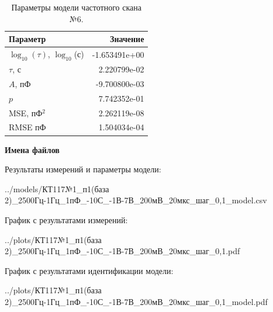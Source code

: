 \begin{table}[!ht]
    \centering
    \caption{Параметры модели частотного скана №6.}
    \begin{tabular}{|l|r|}
        \hline
        Параметр                                       & Значение                  \\ \hline
        $\log_{10}(\tau)$, $\log_{10}$(с)              & -1.653491e+00             \\ \hline
        $\tau$, с                                      & 2.220799e-02              \\ \hline
        $A$, пФ                                        & -9.700800e-03             \\ \hline
        $p$                                            & 7.742352e-01              \\ \hline
        MSE, пФ$^2$                                    & 2.262119e-08              \\ \hline
        RMSE пФ                                        & 1.504034e-04              \\ \hline
    \end{tabular}
    \label{table:frequency_scan_model_6}
\end{table}

\textbf{Имена файлов}

Результаты измерений и параметры модели:

\scriptsize../models/КТ117№1\_п1(база 2)\_2500Гц-1Гц\_1пФ\_-10С\_-1В-7В\_200мВ\_20мкс\_шаг\_0,1\_model.csv
\normalsize

График с результатами измерений:

\scriptsize../plots/КТ117№1\_п1(база 2)\_2500Гц-1Гц\_1пФ\_-10С\_-1В-7В\_200мВ\_20мкс\_шаг\_0,1.pdf
\normalsize

График с результатами идентификации модели:

\scriptsize../plots/КТ117№1\_п1(база 2)\_2500Гц-1Гц\_1пФ\_-10С\_-1В-7В\_200мВ\_20мкс\_шаг\_0,1\_model.pdf
\normalsize


